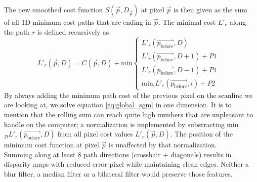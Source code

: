 \documentclass  [
  paper    = a4,
  BCOR     = 10mm,
  twoside,
  fontsize = 12pt,
  fleqn,
  toc      = bibnumbered,
  toc      = listofnumbered,
  numbers  = noendperiod,
  headings = normal,
  listof   = leveldown,
  version  = 3.03
]                                       {scrreprt}
\begin{document}
The new smoothed cost function $S(\vec p , D_{\vec p})$ at pixel $\vec{p}$ is then given as the sum of all 1D minimum cost paths that are ending in $\vec{p}$.  The minimal cost $L'_r$ along the path $r$ is defined recursively as
\begin{equation}\label{eq:local_sgm}
L'_r(\vec{p}, D) = C(\vec{p}, D) + \text {min}
\begin{cases}
	L'_r(\vec{p_\text{before}}, D) \\
	L'_r(\vec{p_\text{before}}, D+1)+P1 \\
	L'_r(\vec{p_\text{before}}, D-1)+P1 \\
	\text{min}_i L'_r(\vec{p_\text{before}}, i)+P2 
\end{cases}
\end{equation} 
By always adding the minimum path cost of the previous pixel on the scanline we are looking at, we solve equation \ref{eq:global_sgm} in one dimension. It is to mention that the rolling sum can reach quite high numbers that are unpleasant to handle on the computer; a normalization is implemented by substracting min$_D L'_r(\vec{p_\text{before}}, D)$ from all pixel cost values $L'_r(\vec{p}, D)$. The position of the minimum cost function at pixel $\vec p$ is unaffected by that normalization.\\
 Summing along at least 8 path directions (crosshair + diagonals) results in disparity maps with reduced error pixel while maintaining clean edges. Neither a blur filter, a median filter or a bilateral filter would preserve those features.
\end{document}
